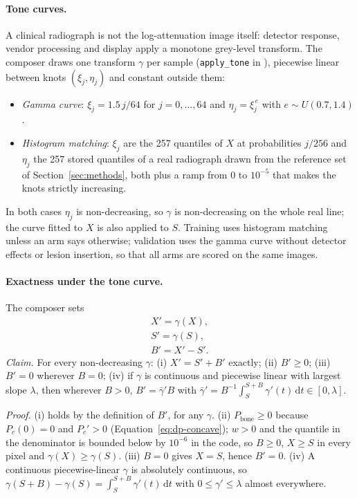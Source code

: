 \paragraph{Tone curves.} A clinical radiograph is not the log-attenuation image itself: detector response, vendor processing and display apply a
monotone grey-level transform. The composer draws one transform $\gamma$ per sample (\texttt{apply\_tone} in ), piecewise
linear between knots $(\xi_j,\eta_j)$ and constant outside them:
\begin{itemize}
\item \emph{Gamma curve}: $\xi_j=1.5\,j/64$ for $j=0,\ldots,64$ and $\eta_j=\xi_j^{\,e}$ with $e\sim U(0.7,1.4)$.
\item \emph{Histogram matching}: $\xi_j$ are the 257 quantiles of $X$ at probabilities $j/256$ and $\eta_j$ the 257 stored quantiles of a real
radiograph drawn from the reference set of Section~\ref{sec:methods}, both plus a ramp from 0 to $10^{-5}$ that makes the knots strictly increasing.
\end{itemize}
In both cases $\eta_j$ is non-decreasing, so $\gamma$ is non-decreasing on the whole real line; the curve fitted to $X$ is also applied to $S$.
Training uses histogram matching unless an arm says otherwise; validation uses the gamma curve without detector effects or lesion insertion, so
that all arms are scored on the same images.

\paragraph{Exactness under the tone curve.} The composer sets
\begin{equation}
\begin{gathered}
X'=\gamma(X),\\
S'=\gamma(S),\\
B'=X'-S' .
\end{gathered}
\label{eq:dp-tone}
\end{equation}
\emph{Claim.} For every non-decreasing $\gamma$: (i) $X'=S'+B'$ exactly; (ii) $B'\ge0$; (iii) $B'=0$ wherever $B=0$; (iv) if $\gamma$ is
continuous and piecewise linear with largest slope $\lambda$, then wherever $B>0$, $B'=\bar\gamma'B$ with
$\bar\gamma'=B^{-1}\int_S^{S+B}\gamma'(t)\,\mathrm dt\in[0,\lambda]$.

\emph{Proof.} (i) holds by the definition of $B'$, for any $\gamma$. (ii) $P_{\mathrm{bone}}\ge0$ because $P_c(0)=0$ and $P_c'>0$
(Equation~\eqref{eq:dp-concave}); $w>0$ and the quantile in the denominator is bounded below by $10^{-6}$ in the code, so $B\ge0$, $X\ge S$ in
every pixel and $\gamma(X)\ge\gamma(S)$. (iii) $B=0$ gives $X=S$, hence $B'=0$. (iv) A continuous piecewise-linear $\gamma$ is absolutely
continuous, so $\gamma(S+B)-\gamma(S)=\int_S^{S+B}\gamma'(t)\,\mathrm dt$ with $0\le\gamma'\le\lambda$ almost everywhere.


